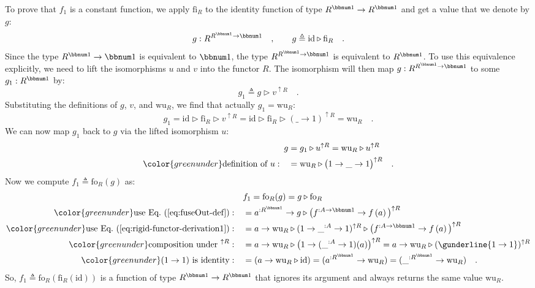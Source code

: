 To prove that $f_{1}$ is a constant function, we apply $\text{fi}_{R}$
to the identity function of type $R^{\bbnum 1}\rightarrow R^{\bbnum 1}$
and get a value that we denote by $g$:
\[
g:R^{R^{\bbnum 1}\rightarrow\bbnum 1}\quad,\quad\quad g\triangleq\text{id}\triangleright\text{fi}_{R}\quad.
\]
Since the type $R^{\bbnum 1}\rightarrow\bbnum 1$ is equivalent to
$\bbnum 1$, the type $R^{R^{\bbnum 1}\rightarrow\bbnum 1}$ is equivalent
to $R^{\bbnum 1}$. To use this equivalence explicitly, we need to
lift the isomorphisms $u$ and $v$ into the functor $R$. The isomorphism
will then map $g:R^{R^{\bbnum 1}\rightarrow\bbnum 1}$ to some $g_{1}:R^{\bbnum 1}$
by:
\[
g_{1}\triangleq g\triangleright v^{\uparrow R}\quad.
\]
Substituting the definitions of $g$, $v$, and $\text{wu}_{R}$,
we find that actually $g_{1}=\text{wu}_{R}$:
\[
g_{1}=\text{id}\triangleright\text{fi}_{R}\triangleright v^{\uparrow R}=\text{id}\triangleright\text{fi}_{R}\triangleright(\_\rightarrow1)^{\uparrow R}=\text{wu}_{R}\quad.
\]
We can now map $g_{1}$ back to $g$ via the lifted isomorphism $u$:
\begin{align}
g & =g_{1}\triangleright u^{\uparrow R}=\text{wu}_{R}\triangleright u^{\uparrow R}\nonumber \\
{\color{greenunder}\text{definition of }u:}\quad & =\text{wu}_{R}\triangleright\big(1\rightarrow\_\rightarrow1\big)^{\uparrow R}\quad.\label{eq:rigid-functor-derivation1}
\end{align}
Now we compute $f_{1}\triangleq\text{fo}_{R}(g)$ as:
\begin{align*}
 & f_{1}=\text{fo}_{R}(g)=g\triangleright\text{fo}_{R}\\
{\color{greenunder}\text{use Eq.~(\ref{eq:fuseOut-def})}:}\quad & =a^{:R^{\bbnum 1}}\rightarrow g\triangleright\big(f^{:A\rightarrow\bbnum 1}\rightarrow f\left(a\right)\big)^{\uparrow R}\\
{\color{greenunder}\text{use Eq.~(\ref{eq:rigid-functor-derivation1})}:}\quad & =a\rightarrow\text{wu}_{R}\triangleright(1\rightarrow\_^{:A}\rightarrow1)^{\uparrow R}\triangleright\big(f^{:A\rightarrow\bbnum 1}\rightarrow f\left(a\right)\big)^{\uparrow R}\\
{\color{greenunder}\text{composition under }^{\uparrow R}:}\quad & =a\rightarrow\text{wu}_{R}\triangleright\big(1\rightarrow(\_^{:A}\rightarrow1)(a)\big)^{\uparrow R}=a\rightarrow\text{wu}_{R}\triangleright(\gunderline{1\rightarrow1})^{\uparrow R}\\
{\color{greenunder}(1\rightarrow1)\text{ is identity}:}\quad & =(a\rightarrow\text{wu}_{R}\triangleright\text{id})=(a^{:R^{\bbnum 1}}\rightarrow\text{wu}_{R})=(\_^{:R^{\bbnum 1}}\rightarrow\text{wu}_{R})\quad.
\end{align*}
So, $f_{1}\triangleq\text{fo}_{R}(\text{fi}_{R}(\text{id}))$ is a
function of type $R^{\bbnum 1}\rightarrow R^{\bbnum 1}$ that ignores
its argument and always returns the same value $\text{wu}_{R}$.

